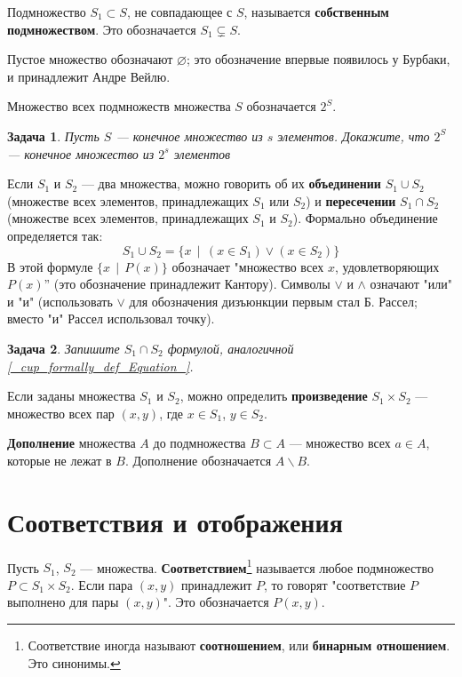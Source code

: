\documentclass[12pt]{book}
\renewcommand{\emptyset}{\varnothing}
\theoremstyle{upshape}
\newtheorem{zadacha}{Задача}[chapter]
\theoremstyle{generic}
\newtheorem{remark}[teorema]{Замечание}
\def\замечание{\begin{remark}}
\def\еза{\end{remark}}
\theoremstyle{upshapenonumber}
\newcommand{\следствие}{%
     \refstepcounter{teorema}
     {\noindent\bf Следствие \thechapter.\arabic{teorema}:\ }}
\newcommand{\пример}{%
     \refstepcounter{teorema}
     {\noindent\bf Пример \thechapter.\arabic{teorema}:\ }}
\newcommand{\лемма}{%
     \refstepcounter{teorema}
     {\noindent\bf Лемма \thechapter.\arabic{teorema}:\ }}
\newcommand{\теорема}{%
     \refstepcounter{teorema}
     {\noindent\bf Теорема \thechapter.\arabic{teorema}:\ }}
\newcommand{\утверждение}{%
     \refstepcounter{teorema}
     {\noindent\bf Утверждение \thechapter.\arabic{teorema}:\ }}
\def\бф{\bf}
\def\ем{\em}
\def\задача{\begin{zadacha}}
\def\ез{\end{zadacha}}
\def\еу{\end{ukazanie}}
\def\ео{\end{opredelenie}}
\def\енум{\begin{enumerate}}
\def\ее{\end{enumerate}}
\begin{document}
Подмножество $S_1\subset S$, не совпадающее с $S$,
называется {\бф собственным подмножеством}.
Это обозначается $S_1\subsetneq S$.

Пустое множество обозначают $\emptyset$;
это обозначение впервые появилось у Бурбаки, и 
принадлежит Андре Вейлю.

Множество всех подмножеств множества $S$ обозначается $2^S$.



\задача
Пусть $S$ --- конечное множество из $s$ элементов.
Докажите, что $2^S$ --- конечное множество из $2^s$
элементов
\ез


Если $S_1$ и $S_2$ --- два множества, можно говорить
об их {\бф объединении} $S_1\cup S_2$ (множестве всех элементов,
принадлежащих $S_1$ или $S_2$) и {\бф пересечении}
$S_1\cap S_2$
(множестве всех элементов,
принадлежащих $S_1$ и $S_2$).
Формально объединение определяется так:
\begin{equation}\label{_cup_formally_def_Equation_}
S_1\cup S_2= \{ x \ \  | \ \ (x\in S_1) \vee (x\in S_2)\}
\end{equation}
В этой формуле $\{ x \ \  | \ \  P(x) \}$
обозначает "множество всех $x$, удовлетворяющих $P(x)$''
(это обозначение принадлежит Кантору). 
Символы $\vee$ и $\wedge$ означают "или" и "и"
(использовать $\vee$ для обозначения дизъюнкции
первым стал Б. Рассел; вместо "и" Рассел 
использовал точку).


\задача
Запишите $S_1\cap S_2$ формулой, аналогичной 
\eqref{_cup_formally_def_Equation_}.
\ез

Если заданы множества $S_1$ и $S_2$, можно определить 
{\бф произведение} $S_1\times S_2$ --- множество всех
пар $(x, y)$, где $x\in S_1$, $y\in S_2$.

\hfill

{\бф Дополнение} множества $A$ до подмножества $B\subset A$ --- 
множество всех $a\in A$, которые не лежат в $B$.
Дополнение обозначается $A\backslash B$.

\section{Соответствия и отображения}
\label{_Sootve_Otobra_Subsection_}

Пусть $S_1$, $S_2$ --- множества. {\бф Соответствием}\footnote{Соответствие
иногда называют {\бф соотношением}, или {\бф бинарным отношением}. Это синонимы.}
называется любое подмножество $P\subset S_1 \times S_2$.
Если пара $(x, y)$ принадлежит $P$, то говорят 
"соответствие $P$ выполнено для пары $(x,y)$".
Это обозначается $P(x,y)$.
\end{document}
